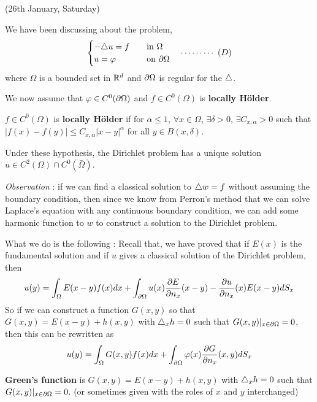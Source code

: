 \documentclass[12pt,a4paper]{article}
\begin{document}
\newday

(26th January, Saturday)
\s

We have been discussing about the problem,
\begin{align*}
\begin{cases}
-\triangle u =f \quad &\text{in }\Omega \\
u=\varphi \quad &\text{on } \partial \Omega
\end{cases} \quad \cdots\cdots\cdots\,\,(D)
\end{align*}
where $\Omega$ is a bounded set in $\mathbb{R}^d$ and $\partial \Omega$ is regular for the $\triangle$.
\s

We now assume that $\varphi \in C^0(\partial \Omega)$ and $f\in C^0(\Omega)$ is \textbf{locally H\"older}.
\s

 $f\in C^0(\Omega)$ is \textbf{locally H\"older} if for $\alpha\leq 1$, $\forall x\in \Omega$, $\exists\delta>0$, $\exists C_{x,\alpha}>0$ such that $|f(x)-f(y)|\leq C_{x,\alpha} |x-y|^{\alpha}$ for all $y\in B(x,\delta)$.
\s

 Under these hypothesis, the Dirichlet problem has a unique solution $u\in C^2(\Omega) \cap C^0(\bar{\Omega})$.
\s

\emph{Observation} : if we can find a classical solution to $\triangle w = f$ without assuming the boundary condition, then since we know from Perron's method that we can solve Laplace's equation with any continuous boundary condition, we can add some harmonic function to $w$ to construct a solution to the Dirichlet problem.
\s

What we do is the following : Recall that, we have proved that if $E(x)$ is the fundamental solution and if $u$ gives a classical solution of the Dirichlet problem, then
\begin{align*}
u(y)= \int_{\Omega} E(x-y) f(x)dx + \int_{\partial \Omega} u(x)\frac{\partial E}{\partial n_x} (x-y) - \frac{\partial u}{\partial n_x}(x) E(x-y) dS_x
\end{align*}
So if we can construct a function $G(x,y)$ so that $G(x,y) = E(x-y) +h(x,y)$ with $\triangle_x h =0$ such that $G(x,y)|_{x\in \partial \Omega} =0$, then this can be rewritten as
\begin{align*}
u(y) = \int_{\Omega} G(x,y) f(x) dx + \int_{\partial \Omega} \varphi(x) \frac{\partial G}{\partial n_x}(x,y) dS_x
\end{align*}
\s

 \textbf{Green's function} is $G(x,y) = E(x-y) +h(x,y)$ with $\triangle_x h =0$ such that $G(x,y)|_{x\in \partial \Omega} =0$. (or sometimes given with the roles of $x$ and $y$ interchanged)
\s
\end{document}
